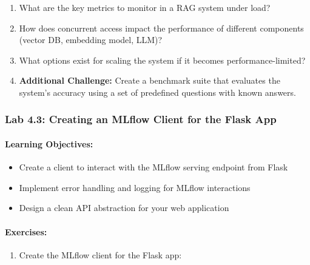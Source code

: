 \documentclass[
  screen,review,acmlarge]{acmart}
\providecommand{\tightlist}{%
  \setlength{\itemsep}{0pt}\setlength{\parskip}{0pt}}
\begin{document}
\begin{enumerate}
\def\labelenumi{\arabic{enumi}.}
\tightlist
\item
  What are the key metrics to monitor in a RAG system under load?
\item
  How does concurrent access impact the performance of different components (vector DB, embedding model, LLM)?
\item
  What options exist for scaling the system if it becomes performance-limited?
\item
  \textbf{Additional Challenge:} Create a benchmark suite that evaluates the system's accuracy using a set of predefined questions with known answers.
\end{enumerate}

\subsubsection{Lab 4.3: Creating an MLflow Client for the Flask App}\label{lab-4.3-creating-an-mlflow-client-for-the-flask-app}

\paragraph{Learning Objectives:}\label{learning-objectives-12}

\begin{itemize}
\tightlist
\item
  Create a client to interact with the MLflow serving endpoint from Flask
\item
  Implement error handling and logging for MLflow interactions
\item
  Design a clean API abstraction for your web application
\end{itemize}

\paragraph{Exercises:}\label{exercises-11}

\begin{enumerate}
\def\labelenumi{\arabic{enumi}.}
\tightlist
\item
  Create the MLflow client for the Flask app:
\end{enumerate}
\end{document}
